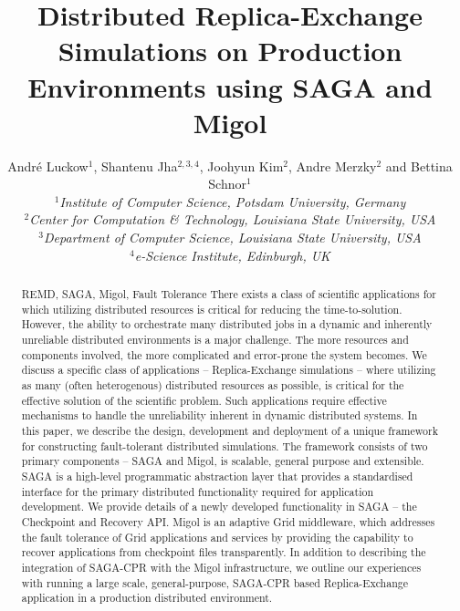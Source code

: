 \documentclass{rspublic}
\title[Distributed Replica-Exchange Simulations]{
  Distributed Replica-Exchange Simulations on Production Environments
  using SAGA and Migol}
\author[Luckow, Jha, Kim, Merzky, Schnor]{
  Andr\'e Luckow$^{1}$, Shantenu Jha$^{2,3,4}$, Joohyun Kim$^{2}$, Andre Merzky$^{2}$ and Bettina Schnor$^{1}$\\
  \small{\emph{$^{1}$Institute of Computer Science, Potsdam University, Germany}}\\
  \small{\emph{$^{2}$Center for Computation \& Technology, Louisiana State University, USA}}\\
  \small{\emph{$^{3}$Department of Computer Science, Louisiana State
      University, USA}}\\
  \small{\emph{$^{4}$e-Science Institute, Edinburgh, UK}}\\
}
\begin{document}
 


\maketitle    

\begin{abstract}{REMD, SAGA, Migol, Fault Tolerance}  
  There exists a class of scientific applications for which utilizing
  distributed resources is critical for reducing the
  time-to-solution. However, the ability to orchestrate many
  distributed jobs in a dynamic and inherently unreliable distributed
  environments is a major challenge. The more resources and components
  involved, %
  the more complicated and error-prone the system becomes. We discuss
  a specific class of applications -- Replica-Exchange simulations
  -- where utilizing as many (often heterogenous) distributed
  resources as possible, is critical for the effective solution of the
  scientific problem. Such applications require effective mechanisms
  to handle the unreliability inherent in dynamic distributed systems.
  In this paper, we describe the design, development and deployment of
  a unique framework for constructing fault-tolerant distributed
  simulations.  The framework consists of two primary components --
  SAGA and Migol, is scalable, general purpose and extensible.  SAGA
  is a high-level programmatic abstraction layer that provides a
  standardised interface for the primary distributed functionality
  required for application development. We provide details of a newly
  developed functionality in SAGA -- the Checkpoint and Recovery
  API. Migol is an adaptive Grid middleware, which addresses the fault
  tolerance of Grid applications and services by providing the
  capability to recover applications from checkpoint files
  transparently.  In addition to describing the integration of
  SAGA-CPR with the Migol infrastructure, we outline our experiences
  with running a large scale, general-purpose, SAGA-CPR based
  Replica-Exchange application in a production distributed
  environment.

    

\end{abstract}
\end{document}
